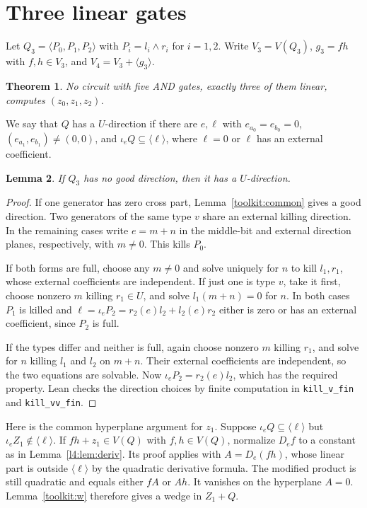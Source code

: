 \documentclass[11pt,a4paper]{article}
\theoremstyle{plain}
\newtheorem{theorem}{Theorem}
\newtheorem{lemma}[theorem]{Lemma}
\theoremstyle{remark}
\theoremstyle{plain}
\begin{document}
\section{Three linear gates}\label{sec:lambda3}
Let $Q_3=\langle P_0,P_1,P_2\rangle$ with $P_i=l_i\wedge r_i$ for $i=1,2$. Write $V_3=V(Q_3)$, $g_3=fh$ with $f,h\in V_3$, and $V_4=V_3+\langle g_3\rangle$.

\begin{theorem}\label{l3:thm:main}
No circuit with five AND gates, exactly three of them linear, computes $(z_0,z_1,z_2)$.
\end{theorem}

We say that $Q$ has a $U$-direction if there are $e,\ell$ with $e_{a_0}=e_{b_0}=0$, $(e_{a_1},e_{b_1})\ne(0,0)$, and $\iota_e Q\subseteq\langle\ell\rangle$, where $\ell=0$ or $\ell$ has an external coefficient.

\begin{lemma}\label{l3:lem:udir}
If $Q_3$ has no good direction, then it has a $U$-direction.
\end{lemma}
\begin{proof}
If one generator has zero cross part, Lemma~\ref{toolkit:common} gives a good direction. Two generators of the same type $v$ share an external killing direction. In the remaining cases write $e=m+n$ in the middle-bit and external direction planes, respectively, with $m\ne0$. This kills $P_0$.

If both forms are full, choose any $m\ne0$ and solve uniquely for $n$ to kill $l_1,r_1$, whose external coefficients are independent. If just one is type $v$, take it first, choose nonzero $m$ killing $r_1\in U$, and solve $l_1(m+n)=0$ for $n$. In both cases $P_1$ is killed and $\ell=\iota_eP_2=r_2(e)l_2+l_2(e)r_2$ either is zero or has an external coefficient, since $P_2$ is full.

If the types differ and neither is full, again choose nonzero $m$ killing $r_1$, and solve for $n$ killing $l_1$ and $l_2$ on $m+n$. Their external coefficients are independent, so the two equations are solvable. Now $\iota_eP_2=r_2(e)l_2$, which has the required property. Lean checks the direction choices by finite computation in \nolinkurl{kill_v_fin} and \nolinkurl{kill_vv_fin}.
\end{proof}

Here is the common hyperplane argument for $z_1$. Suppose $\iota_e Q\subseteq\langle\ell\rangle$ but $\iota_e Z_1\notin\langle\ell\rangle$. If $fh+z_1\in V(Q)$ with $f,h\in V(Q)$, normalize $D_e f$ to a constant as in Lemma~\ref{l4:lem:deriv}. Its proof applies with $A=D_e(fh)$, whose linear part is outside $\langle\ell\rangle$ by the quadratic derivative formula. The modified product is still quadratic and equals either $fA$ or $Ah$. It vanishes on the hyperplane $A=0$. Lemma~\ref{toolkit:w} therefore gives a wedge in $Z_1+Q$.
\end{document}
